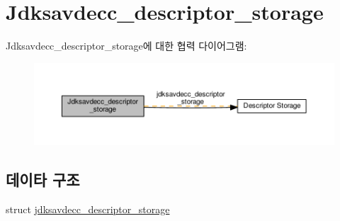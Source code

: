 \hypertarget{group__jdksavdecc__descriptor__storage}{}\section{Jdksavdecc\+\_\+descriptor\+\_\+storage}
\label{group__jdksavdecc__descriptor__storage}
Jdksavdecc\+\_\+descriptor\+\_\+storage에 대한 협력 다이어그램\+:
\nopagebreak
\begin{figure}[H]
\begin{center}
\leavevmode
\includegraphics[width=350pt]{group__jdksavdecc__descriptor__storage}
\end{center}
\end{figure}
\subsection*{데이타 구조}
\begin{DoxyCompactItemize}
\item 
struct \hyperlink{structjdksavdecc__descriptor__storage}{jdksavdecc\+\_\+descriptor\+\_\+storage}
\end{DoxyCompactItemize}
